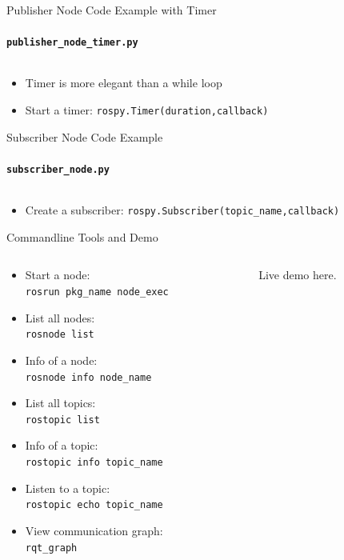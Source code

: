 \documentclass[aspectratio=43]{beamer}
\newcommand{\pyinline}[1]{\texttt{#1}}
\newcommand{\inline}[1]{\texttt{#1}}
\begin{document}
\begin{frame}{Publisher Node Code Example with Timer}
	\framesubtitle{\texttt{publisher\_node\_timer.py}}
	\inputminted{python}{snippet/publisher_node_timer.py}
	\begin{itemize}
	\item Timer is more elegant than a while loop
	\item Start a timer: \pyinline{rospy.Timer(duration,callback)}
	\end{itemize}
\end{frame}

\begin{frame}{Subscriber Node Code Example}
	\framesubtitle{\texttt{subscriber\_node.py}}
	\inputminted{python}{snippet/subscriber_node.py}
	\begin{itemize}
		\item Create a subscriber: \pyinline{rospy.Subscriber(topic_name,callback)}
	\end{itemize}
\end{frame}

\begin{frame}{Commandline Tools and Demo}
	\begin{columns}
		\begin{column}{0.5\textwidth}
			\begin{itemize}
				\item Start a node:\\\inline{rosrun pkg_name node_exec}
				\item List all nodes:\\\inline{rosnode list}
				\item Info of a node:\\\inline{rosnode info node_name}
				\item List all topics:\\\inline{rostopic list}
				\item Info of a topic:\\\inline{rostopic info topic_name}
				\item Listen to a topic:\\\inline{rostopic echo topic_name}
				\item View communication graph:\\\inline{rqt_graph}
			\end{itemize}
		\end{column}
		\begin{column}{0.5\textwidth}
			\centering
			Live demo here.
		\end{column}
	\end{columns}
\end{frame}
\end{document}
